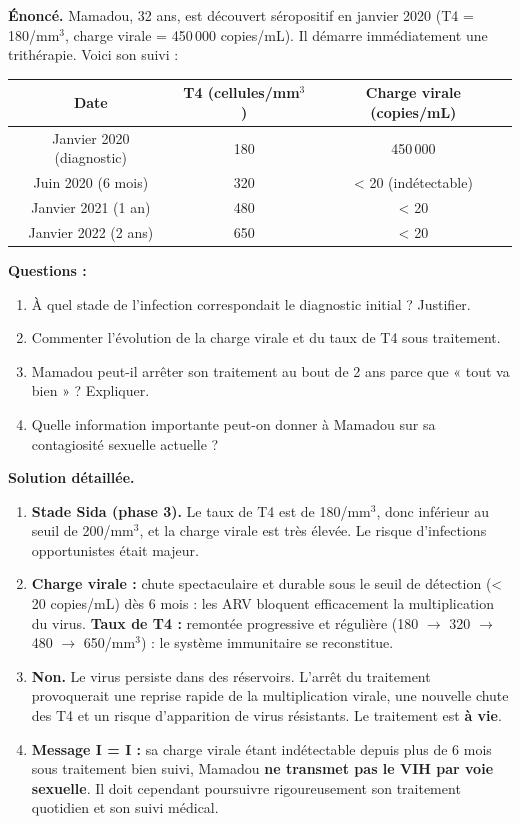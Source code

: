 \documentclass[11pt]{article}
\begin{document}
\begin{exoresolu}
\textbf{Énoncé.} Mamadou, 32 ans, est découvert séropositif en janvier 2020 (T4 = 180/mm$^3$, charge virale = 450\,000 copies/mL). Il démarre immédiatement une trithérapie. Voici son suivi :
\begin{center}
\begin{tabular}{|c|c|c|}\hline
\rowcolor{popblueL}
\textbf{Date} & \textbf{T4 (cellules/mm$^3$)} & \textbf{Charge virale (copies/mL)} \\\hline
Janvier 2020 (diagnostic) & 180 & 450\,000 \\\hline
Juin 2020 (6 mois) & 320 & < 20 (indétectable) \\\hline
Janvier 2021 (1 an) & 480 & < 20 \\\hline
Janvier 2022 (2 ans) & 650 & < 20 \\\hline
\end{tabular}
\end{center}
\textbf{Questions :}
\begin{enumerate}
    \item À quel stade de l'infection correspondait le diagnostic initial ? Justifier.
    \item Commenter l'évolution de la charge virale et du taux de T4 sous traitement.
    \item Mamadou peut-il arrêter son traitement au bout de 2 ans parce que « tout va bien » ? Expliquer.
    \item Quelle information importante peut-on donner à Mamadou sur sa contagiosité sexuelle actuelle ?
\end{enumerate}

\tcblower
\textbf{Solution détaillée.}
\begin{enumerate}
    \item \textbf{Stade Sida (phase 3).} Le taux de T4 est de 180/mm$^3$, donc inférieur au seuil de 200/mm$^3$, et la charge virale est très élevée. Le risque d'infections opportunistes était majeur.
    \item \textbf{Charge virale :} chute spectaculaire et durable sous le seuil de détection (< 20 copies/mL) dès 6 mois : les ARV bloquent efficacement la multiplication du virus. \textbf{Taux de T4 :} remontée progressive et régulière (180 $\rightarrow$ 320 $\rightarrow$ 480 $\rightarrow$ 650/mm$^3$) : le système immunitaire se reconstitue.
    \item \textbf{Non.} Le virus persiste dans des réservoirs. L'arrêt du traitement provoquerait une reprise rapide de la multiplication virale, une nouvelle chute des T4 et un risque d'apparition de virus résistants. Le traitement est \textbf{à vie}.
    \item \textbf{Message I = I :} sa charge virale étant indétectable depuis plus de 6 mois sous traitement bien suivi, Mamadou \textbf{ne transmet pas le VIH par voie sexuelle}. Il doit cependant poursuivre rigoureusement son traitement quotidien et son suivi médical.
\end{enumerate}
\end{exoresolu}
\end{document}
